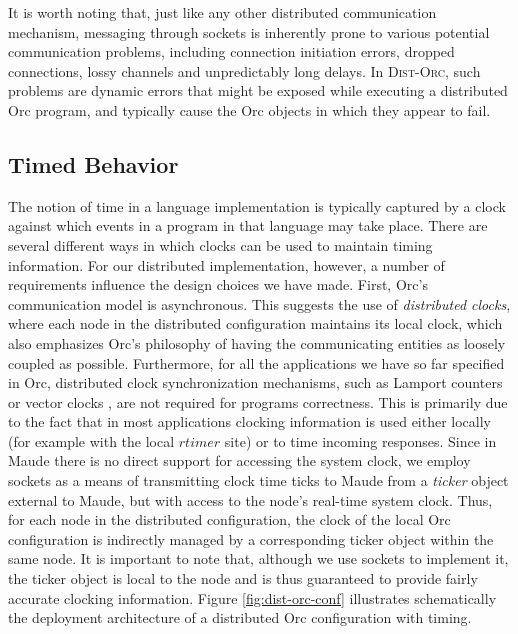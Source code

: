 \documentclass{eptcs}
\begin{document}
It is worth noting that, just like any other distributed communication mechanism, messaging through sockets is inherently prone to various potential communication problems, including connection initiation errors, dropped connections, lossy channels and unpredictably long delays. In \textsc{Dist-Orc}, such problems are dynamic errors that might be exposed while executing a distributed Orc program, and typically cause the Orc objects in which they appear to fail.


\subsection{Timed Behavior} \label{sec:timed-implementation}


The notion of time in a language implementation is typically captured by a clock against which events in a program in that language may take place. There are several different ways in which clocks can be used to maintain timing information. For our distributed implementation, however, a number of requirements influence the design choices we have made. First, Orc's communication model is asynchronous. This suggests the use of \emph{distributed clocks}, where each node in the distributed configuration maintains its local clock, which also emphasizes Orc's philosophy of having the communicating entities as loosely coupled as possible. Furthermore, for all the applications we have so far specified in Orc, distributed clock synchronization mechanisms, such as Lamport counters \cite{Lamport78} or vector clocks \cite{Mattern89,Fidge88}, are not required for programs correctness. This is primarily due to the fact that in most applications clocking information is used either locally (for example with the local $\mathit{rtimer}$ site) or to time incoming responses. Since in Maude there is no direct support for accessing the system clock, we employ sockets as a means of transmitting clock time ticks to Maude from a \emph{ticker} object external to Maude, but with access to the node's real-time system clock. Thus, for each node in the distributed configuration, the clock of the local Orc configuration is indirectly managed by a corresponding ticker object within the same node. 
It is important to note that, although we use sockets to implement it, the ticker object is local to the node and is thus guaranteed to provide fairly accurate clocking information. Figure \ref{fig:dist-orc-conf} illustrates schematically the deployment architecture of a distributed Orc configuration with timing.
\end{document}
